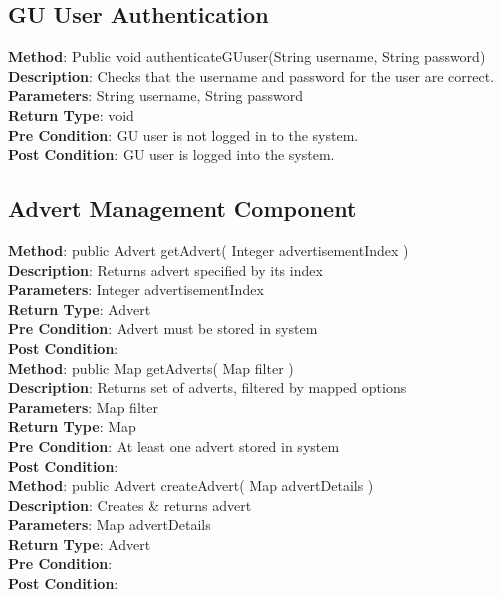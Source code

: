 \documentclass{l3deliverable}
\begin{document}
\subsection{GU User Authentication}

\textbf{Method}: Public void authenticateGUuser(String username, String password)\\
\textbf{Description}: Checks that the username and password for the user are correct. \\
\textbf{Parameters}: String username, String password\\
\textbf{Return Type}: void\\
\textbf{Pre Condition}: GU user is not logged in to the system.\\
\textbf{Post Condition}: GU user is logged into the system.\\


\subsection{Advert Management Component}
\textbf{Method}: public Advert getAdvert( Integer advertisementIndex )\\
\textbf{Description}: Returns advert specified by its index\\
\textbf{Parameters}: Integer advertisementIndex\\
\textbf{Return Type}: Advert\\
\textbf{Pre Condition}: Advert must be stored in system\\
\textbf{Post Condition}:\\

\textbf{Method}: public Map getAdverts( Map filter )\\
\textbf{Description}: Returns set of adverts, filtered by mapped options\\
\textbf{Parameters}: Map filter\\
\textbf{Return Type}: Map\\
\textbf{Pre Condition}: At least one advert stored in system\\
\textbf{Post Condition}:\\

\textbf{Method}: public Advert createAdvert( Map advertDetails )\\
\textbf{Description}: Creates \& returns advert\\
\textbf{Parameters}: Map advertDetails\\
\textbf{Return Type}: Advert \\
\textbf{Pre Condition}:\\
\textbf{Post Condition}:\\
\end{document}
